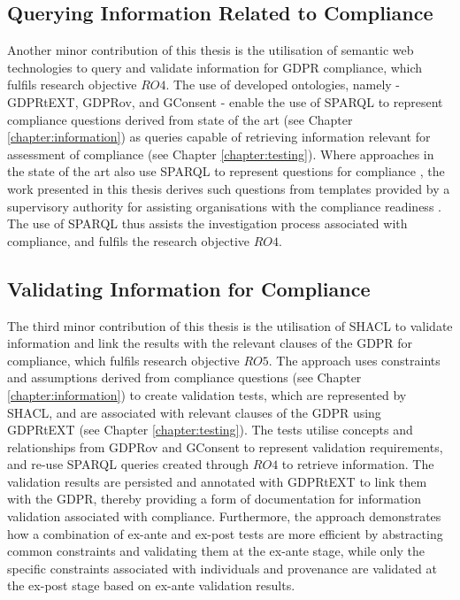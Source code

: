 \subsection{Querying Information Related to Compliance}\label{sec:contributions:querying}
Another minor contribution of this thesis is the utilisation of semantic web technologies to query and validate information for GDPR compliance, which fulfils research objective $RO4$.
The use of developed ontologies, namely - GDPRtEXT, GDPRov, and GConsent - enable the use of SPARQL to represent compliance questions derived from state of the art (see Chapter \ref{chapter:information}) as queries capable of retrieving information relevant for assessment of compliance (see Chapter \ref{chapter:testing}).
Where approaches in the state of the art also use SPARQL to represent questions for compliance \cite{agarwal_legislative_2018,palmirani_pronto:_2018}, the work presented in this thesis derives such questions from templates provided by a supervisory authority for assisting organisations with the compliance readiness \cite{noauthor_gdpr_2017}.
The use of SPARQL thus assists the investigation process associated with compliance, and fulfils the research objective $RO4$.

\subsection{Validating Information for Compliance}\label{sec:contributions:validation}
The third minor contribution of this thesis is the utilisation of SHACL to validate information and link the results with the relevant clauses of the GDPR for compliance, which fulfils research objective $RO5$.
The approach uses constraints and assumptions derived from compliance questions (see Chapter \ref{chapter:information}) to create validation tests, which are represented by SHACL, and are associated with relevant clauses of the GDPR using GDPRtEXT (see Chapter \ref{chapter:testing}). The tests utilise concepts and relationships from GDPRov and GConsent to represent validation requirements, and re-use SPARQL queries created through $RO4$ to retrieve information.
The validation results are persisted and annotated with GDPRtEXT to link them with the GDPR, thereby providing a form of documentation for information validation associated with compliance.
Furthermore, the approach demonstrates how a combination of ex-ante and ex-post tests are more efficient by abstracting common constraints and validating them at the ex-ante stage, while only the specific constraints associated with individuals and provenance are validated at the ex-post stage based on ex-ante validation results.

